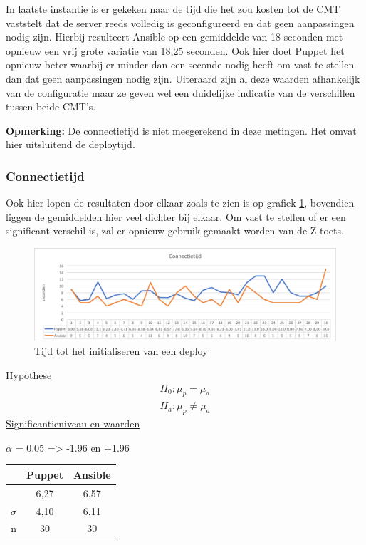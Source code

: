 In laatste instantie is er gekeken naar de tijd die het zou kosten tot de \gls{CMT} vaststelt dat de server reeds volledig is geconfigureerd en dat geen aanpassingen nodig zijn. Hierbij resulteert Ansible op een gemiddelde van 18 seconden met opnieuw een vrij grote variatie van 18,25 seconden. Ook hier doet Puppet het opnieuw beter waarbij er minder dan een seconde nodig heeft om vast te stellen dan dat geen aanpassingen nodig zijn. Uiteraard zijn al deze waarden afhankelijk van de configuratie maar ze geven wel een duidelijke indicatie van de verschillen tussen beide \gls{CMT}'s.

\textbf{Opmerking:} De connectietijd is niet meegerekend in deze metingen. Het omvat hier uitsluitend de deploytijd.
\subsubsection{Connectietijd}
Ook hier lopen de resultaten door elkaar zoals te zien is op grafiek \ref{fig:connectiontime}, bovendien liggen de gemiddelden hier veel dichter bij elkaar. Om vast te stellen of er een significant verschil is, zal er opnieuw gebruik gemaakt worden van de Z toets.
\begin{figure}
  \includegraphics[width=\linewidth]{img/connectiontime.png} 
  \caption{Tijd tot het initialiseren van een deploy}  
  \label{fig:connectiontime}
\end{figure}



\underline{Hypothese}
\begin{align*}
H_0:  \mu_p = \mu_a \\
H_a: \mu_p\neq \mu_a 
\end{align*}
\underline{Significantieniveau en waarden} \newline

 $\alpha$ = 0.05 => -1.96 en +1.96 \newline

		\begin{tabular}{ r |c |c }
			& Puppet & Ansible\\\hline
			\unexpanded{$ \bar x  $} &  6,27 & 6,57\\ \hline
			$\sigma$ & 4,10 & 6,11\\ \hline
			n &  30 &  30

\end{tabular}



